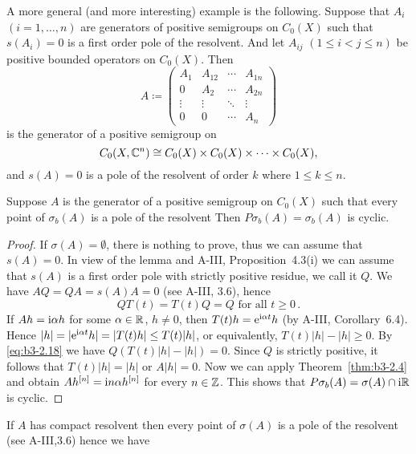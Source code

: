 A more general (and more interesting) example is the following.
Suppose that $A_{i}$ $(i = 1,\ldots,n)$ are generators of positive semigroups on $C_{0}(X)$ such that $s(A_{i}) = 0$ is a first order pole of the resolvent.
And let $A_{ij}$ $(1 \leq i < j \leq n)$ be positive bounded operators on $C_{0}(X)$.
Then
\[
A \coloneqq \begin{pmatrix}
	A_{1} & A_{12} & \cdots & A_{1n} \\
	0 & A_{2} & \cdots & A_{2n} \\
	\vdots & \vdots & \ddots & \vdots \\
	0 & 0 & \cdots & A_{n}
\end{pmatrix}
\]
is the generator of a positive semigroup on 
%
\[
	C_{0}(X,\mathbb{C}^{n}) \cong C_{0}(X) \times C_{0}(X) \times \cdots \times C_{0}(X) , 
\]
%
and $s(A) = 0$ is a pole of the resolvent of order $k$ where $1 \leq k \leq n$.
\begin{theorem}\label{thm:b3-2.9}
Suppose $A$ is the generator of a positive semigroup on $C_{0}(X)$ such that every point of $\sigma_{b}(A)$ is a pole of the resolvent
Then $P\sigma_{b}(A) = \sigma_{b}(A)$ is cyclic.
\end{theorem}
\begin{proof}
	If $\sigma(A) = \emptyset$, there is nothing to prove, thus we can assume that $s(A) = 0$.
	In view of the lemma and A-III, Proposition~4.3(i) we can assume that $s(A)$ is a first order pole with strictly positive residue, we call it $Q$.
	We have $AQ = QA = s(A)A = 0$ (see A-III, 3.6), hence
	\begin{equation}\label{eq:b3-2.18}
		QT(t) = T(t)Q = Q \text{ for all } t \geq 0\,.
	\end{equation}
	If $Ah = \mathrm{i}\alpha h$ for some $\alpha \in \mathbb{R}$, $h \neq 0$, then $T(t)h = \mathrm{e}^{\mathrm{i}\alpha t}h$ (by A-III, Corollary~6.4).
	Hence $|h| = |\mathrm{e}^{\mathrm{i}\alpha t}h| = |T(t)h| \leq T(t)|h|$, or equivalently, $T(t)|h| - |h| \geq 0$.
	By \eqref{eq:b3-2.18} we have $Q(T(t)|h| - |h|) = 0$.
	Since $Q$ is strictly positive, it follows that $T(t)|h| = |h|$ or $A|h| = 0$.
	Now we can apply Theorem~\ref{thm:b3-2.4} and obtain $Ah^{[n]} = \mathrm{i} n\alpha h^{[n]}$ for every $n \in \mathbb{Z}$.
	This shows that $P\sigma_{b}(A) = \sigma(A) \cap \mathrm{i}\mathbb{R}$ is cyclic.
\end{proof}
If $A$ has compact resolvent then every point of $\sigma(A)$ is a pole of the resolvent (see A-III,3.6) hence we have
